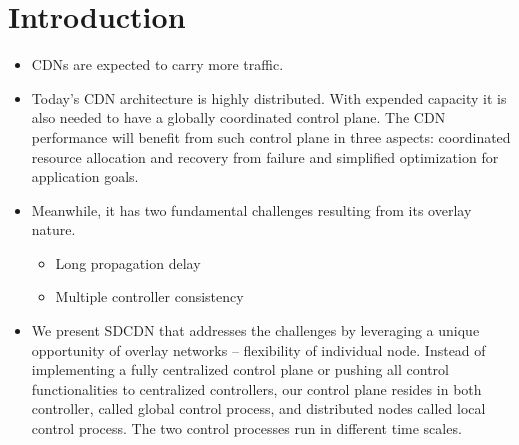 \section{Introduction}

\begin{itemize}
	\item CDNs are expected to carry more traffic. 
	\item Today's CDN architecture is highly distributed. With expended capacity it is also needed to have a globally coordinated control plane. The CDN performance will benefit from such control plane in three aspects: coordinated resource allocation and recovery from failure and simplified optimization for application goals. 
	\item Meanwhile, it has two fundamental challenges resulting from its overlay nature.
	\begin{itemize}
		\item Long propagation delay
		\item Multiple controller consistency
	\end{itemize}
	\item We present SDCDN that addresses the challenges by leveraging a unique opportunity of overlay networks -- flexibility of individual node. Instead of implementing a fully centralized control plane or pushing all control functionalities to centralized controllers, our control plane resides in both controller, called global control process, and distributed nodes called local control process. The two control processes run in different time scales.
\end{itemize}
